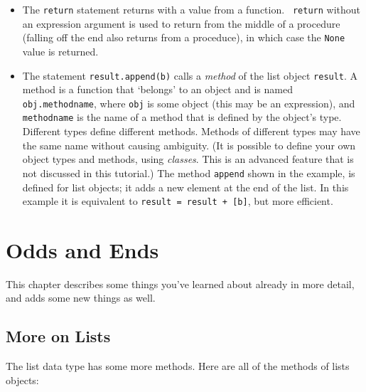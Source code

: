 \begin{itemize}

\item
The {\tt return} statement returns with a value from a function.  {\tt
return} without an expression argument is used to return from the middle
of a procedure (falling off the end also returns from a proceduce), in
which case the {\tt None} value is returned.

\item
The statement {\tt result.append(b)} calls a {\em method} of the list
object {\tt result}.  A method is a function that `belongs' to an
object and is named {\tt obj.methodname}, where {\tt obj} is some
object (this may be an expression), and {\tt methodname} is the name
of a method that is defined by the object's type.  Different types
define different methods.  Methods of different types may have the
same name without causing ambiguity.  (It is possible to define your
own object types and methods, using {\em classes}.  This is an
advanced feature that is not discussed in this tutorial.)
The method {\tt append} shown in the example, is defined for
list objects; it adds a new element at the end of the list.  In this
example
it is equivalent to {\tt result = result + [b]}, but more efficient.

\end{itemize}


\chapter{Odds and Ends}

This chapter describes some things you've learned about already in
more detail, and adds some new things as well.

\section{More on Lists}

The list data type has some more methods.  Here are all of the methods
of lists objects:

